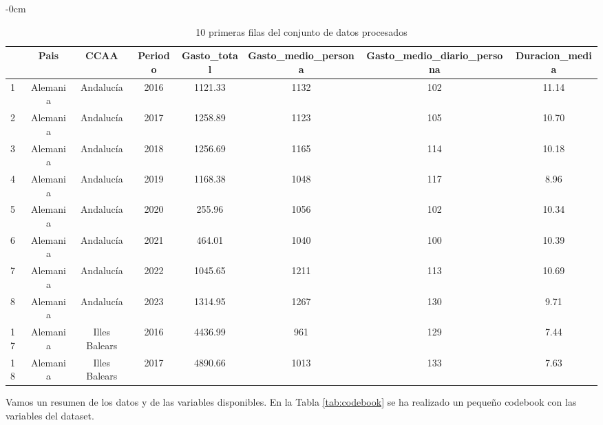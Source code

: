 \documentclass[data,article,submit,moreauthors,pdftex]{Definitions/mdpi}
\begin{document}
\begin{table}[H]

\caption{\label{tab:unnamed-chunk-27} 10 primeras filas del conjunto de datos procesados}
             \begin{adjustwidth}{-\extralength}{0cm}
             \small
\begin{tabular}[t]{lccccccc}
\toprule
  & Pais & CCAA & Periodo & Gasto\_total & Gasto\_medio\_persona & Gasto\_medio\_diario\_persona & Duracion\_media\\
\midrule
1 & Alemania & Andalucía & 2016 & 1121.33 & 1132 & 102 & 11.14\\
2 & Alemania & Andalucía & 2017 & 1258.89 & 1123 & 105 & 10.70\\
3 & Alemania & Andalucía & 2018 & 1256.69 & 1165 & 114 & 10.18\\
4 & Alemania & Andalucía & 2019 & 1168.38 & 1048 & 117 & 8.96\\
5 & Alemania & Andalucía & 2020 & 255.96 & 1056 & 102 & 10.34\\
6 & Alemania & Andalucía & 2021 & 464.01 & 1040 & 100 & 10.39\\
7 & Alemania & Andalucía & 2022 & 1045.65 & 1211 & 113 & 10.69\\
8 & Alemania & Andalucía & 2023 & 1314.95 & 1267 & 130 & 9.71\\
17 & Alemania & Illes Balears & 2016 & 4436.99 & 961 & 129 & 7.44\\
18 & Alemania & Illes Balears & 2017 & 4890.66 & 1013 & 133 & 7.63\\
\bottomrule
\end{tabular}
    \end{adjustwidth}
\end{table}

Vamos un resumen de los datos y de las variables disponibles. En la
Tabla \ref{tab:codebook} se ha realizado un pequeño codebook con las
variables del dataset.
\end{document}

